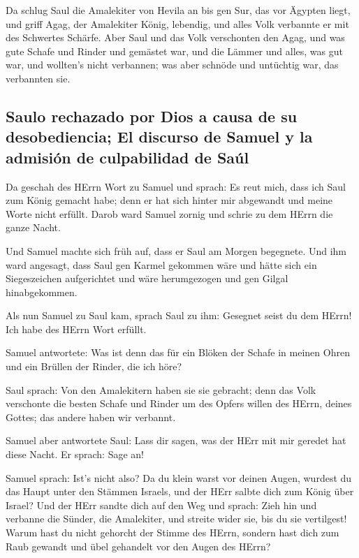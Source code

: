  Da schlug Saul die Amalekiter von Hevila an bis gen Sur,
das vor Ägypten liegt,  und griff Agag, der Amalekiter
König, lebendig, und alles Volk verbannte er mit des Schwertes Schärfe.
 Aber Saul und das Volk verschonten den Agag, und was gute
Schafe und Rinder und gemästet war, und die Lämmer und alles, was gut
war, und wollten's nicht verbannen; was aber schnöde und untüchtig war,
das verbannten sie.

\hypertarget{saulo-rechazado-por-dios-a-causa-de-su-desobediencia-el-discurso-de-samuel-y-la-admisiuxf3n-de-culpabilidad-de-sauxfal}{%
\subsection{Saulo rechazado por Dios a causa de su desobediencia; El
discurso de Samuel y la admisión de culpabilidad de
Saúl}\label{saulo-rechazado-por-dios-a-causa-de-su-desobediencia-el-discurso-de-samuel-y-la-admisiuxf3n-de-culpabilidad-de-sauxfal}}

 Da geschah des HErrn Wort zu Samuel und sprach:
 Es reut mich, dass ich Saul zum König gemacht habe; denn
er hat sich hinter mir abgewandt und meine Worte nicht erfüllt. Darob
ward Samuel zornig und schrie zu dem HErrn die ganze Nacht.

 Und Samuel machte sich früh auf, dass er Saul am Morgen
begegnete. Und ihm ward angesagt, dass Saul gen Karmel gekommen wäre und
hätte sich ein Siegeszeichen aufgerichtet und wäre herumgezogen und gen
Gilgal hinabgekommen.

 Als nun Samuel zu Saul kam, sprach Saul zu ihm: Gesegnet
seist du dem HErrn! Ich habe des HErrn Wort erfüllt.

 Samuel antwortete: Was ist denn das für ein Blöken der
Schafe in meinen Ohren und ein Brüllen der Rinder, die ich höre?

 Saul sprach: Von den Amalekitern haben sie sie gebracht;
denn das Volk verschonte die besten Schafe und Rinder um des Opfers
willen des HErrn, deines Gottes; das andere haben wir verbannt.

 Samuel aber antwortete Saul: Lass dir sagen, was der
HErr mit mir geredet hat diese Nacht. Er sprach: Sage an!

 Samuel sprach: Ist's nicht also? Da du klein warst vor
deinen Augen, wurdest du das Haupt unter den Stämmen Israels, und der
HErr salbte dich zum König über Israel?  Und der HErr
sandte dich auf den Weg und sprach: Zieh hin und verbanne die Sünder,
die Amalekiter, und streite wider sie, bis du sie vertilgest!
 Warum hast du nicht gehorcht der Stimme des HErrn,
sondern hast dich zum Raub gewandt und übel gehandelt vor den Augen des
HErrn?

